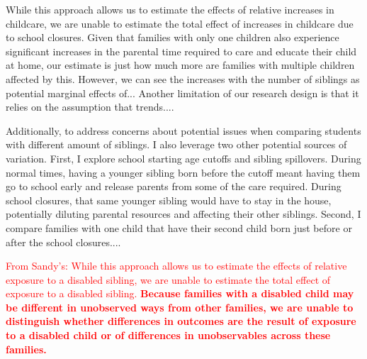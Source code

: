 While this approach allows us to estimate the effects of relative increases in childcare, we are unable to estimate the total effect of increases in childcare due to school closures. Given that families with only one children also experience significant increases in the parental time required to care and educate their child at home, our estimate is just how much more are families with multiple children affected by this. However, we can see the increases with the number of siblings as potential marginal effects of... Another limitation of our research design is that it relies on the assumption that trends....

Additionally, to address concerns about potential issues when comparing students with different amount of siblings. I also leverage two other potential sources of variation. First, I explore school starting age cutoffs and sibling spillovers. During normal times, having a younger sibling born before the cutoff meant having them go to school early and release parents from some of the care required. During school closures, that same younger sibling would have to stay in the house, potentially diluting parental resources and affecting their other siblings. Second, I compare families with one child that have their second child born just before or after the school closures....



\textcolor{red}{From Sandy's: While this approach allows us to estimate the effects of relative exposure to a disabled sibling, we are unable to estimate the total effect of exposure to a disabled sibling. \textbf{Because families with a disabled child may be different in unobserved ways from other families, we are unable to distinguish whether differences in outcomes are the result of exposure to a disabled child or of differences in unobservables across these families.}}

